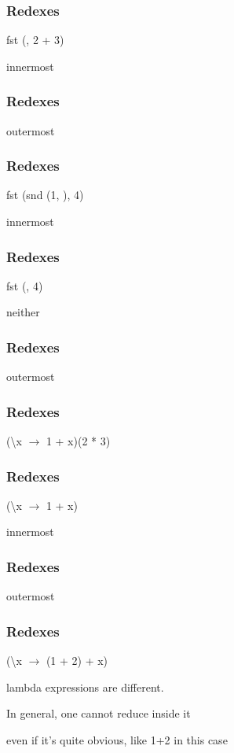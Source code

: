 \documentclass{beamer}
\begin{document}
\begin{frame}
    \frametitle{Redexes}
    fst ({\color{red}{1 + 2}}, 2 + 3)

    \medskip
    innermost
\end{frame}

\begin{frame}
    \frametitle{Redexes}
    {\color{red}{fst (1 + 2, 2 + 3)}}

    \medskip
    outermost
\end{frame}

\begin{frame}
    \frametitle{Redexes}
    fst (snd (1, {\color{red}{2 + 3}}), 4)

    \medskip
    innermost
\end{frame}

\begin{frame}
    \frametitle{Redexes}
    fst ({\color{red}{snd (1, 2 + 3)}}, 4)

    \medskip
    neither
\end{frame}

\begin{frame}
    \frametitle{Redexes}
    {\color{red}{fst (snd (1, 2 + 3), 4)}}

    \medskip
    outermost
\end{frame}

\begin{frame}
    \frametitle{Redexes}
    (\textbackslash x $\rightarrow$ 1 + x)(2 * 3)

\end{frame}

\begin{frame}
    \frametitle{Redexes}
    (\textbackslash x $\rightarrow$ 1 + x){\color{red}{(2 * 3)}}
    
    \medskip
    innermost
\end{frame}

\begin{frame}
    \frametitle{Redexes}
    {\color{red}{(\textbackslash x $\rightarrow$ 1 + x)(2 * 3)}}

    \medskip
    outermost
\end{frame}

\begin{frame}
    \frametitle{Redexes}
    (\textbackslash x $\rightarrow$ (1 + 2) + x)

    \medskip
    lambda expressions are different.

    In general, one cannot reduce inside it

    even if it's quite obvious, like 1+2 in this case
\end{frame}
\end{document}
